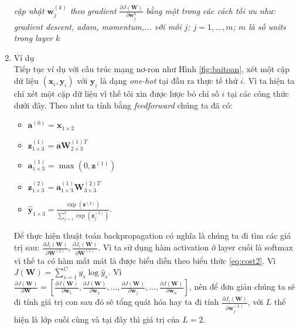 \begin{enumerate}
\begin{algorithm}[H]
\begin{algorithmic}[1]
	\ENDFOR
	\STATE 	\textit{cập nhật }$\textbf{w}^{(k)}_j$ \textit{ theo gradient } $\frac{\partial J(\textbf{W})}{\partial \textbf{w}^{k}_j} $ \textit{ bằng một trong các cách tối ưu như: gradient descent, adam, momentum,... với mỗi $j$; $j =1,\ldots, m$; $m$ là số units trong layer $k$}
	
	\ENDFOR
\ENDFOR
\end{algorithmic}
\end{algorithm}

\item Ví dụ\\
\hspace{5mm} Tiếp tục ví dụ với cấu trúc mạng nơ-ron như Hình \ref{fig:baitoan}, xét một cặp dữ liệu $(\textbf{x}_i,\textbf{y}_i)$ với $\textbf{y}_i$ là dạng \textit{one-hot} tại đầu ra thực tế thứ $i$. Vì ta hiện ta chỉ xét một cặp dữ liệu vì thế tôi xin được lược bỏ chỉ số $i$ tại các công thức dưới đây. Theo như ta tính bằng \textit{feedforward }chúng ta đã có: 
\begin{itemize}
	\item[] $\textbf{a}^{(0)}=\textbf{x}_{1\times2}$
	\item[]  $\textbf{z}^{(1)}_{1 \times 3}=\textbf{a}\textbf{W}^{(1)T}_{2{\times}3}$
	\item[] $\textbf{a}^{(1)}_{1 \times 3}=\max(0,\textbf{z}^{(1)})$
	
	\item[] $\textbf{z}^{(2)}_{1\times 3}=\textbf{a}^{(1)}_{1 \times 3}\textbf{W}^{(2)T}_{3{{\times}}3 }$
	
	\item[] $\widehat{\textbf{y}}_{1\times 3} = \frac{\exp({\textbf{z}^{(2)}})}{\sum^{3}_{j=1}{\exp({\textbf{z}^{(2)}_j})}}$.

\end{itemize}
Để thực hiện thuật toán backpropagation có nghĩa là chúng ta đi tìm các giá trị sau: $\frac{\partial J_i(\textbf{W})}{\partial \textbf{W}^{(2)}},\frac{\partial J_i(\textbf{W})}{\partial \textbf{W}^{(1)}}$. Vì ta sử dụng hàm activation ở layer cuối là softmax vì thế ta có hàm mất mát là được biểu diễn theo biểu thức \ref{eq:cost2}. Vì $J(\textbf{W})=\sum^{C}_{s=1} y_{s}{ \log \widehat{y}_{s}}$. Vì $\frac{\partial J(\textbf{W})}{\partial \textbf{W}} = \left[
\frac{\partial J(\textbf{W})}{\partial \textbf{w}_1}, \frac{\partial J(\textbf{W})}{\partial \textbf{w}_2},...,\frac{\partial J(\textbf{W})}{\partial \textbf{w}_j},...,\frac{\partial J(\textbf{W})}{\partial \textbf{w}_n} \right]$, nên để đơn giản chúng ta sẽ đi tính giá trị con sau đó sẽ tổng quát hóa hay ta đi tính $\frac{\partial J_i(\textbf{W})}{\partial \textbf{w}^{(L)}_j} $, với $L$ thể hiện là lớp cuối cùng và tại đây thì giá trị của $L=2$. 


\end{enumerate}
